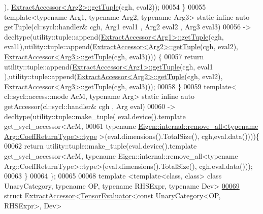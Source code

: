 \begin{DoxyCode}
      ), \hyperlink{struct_eigen_1_1_tensor_sycl_1_1internal_1_1_extract_accessor}{ExtractAccessor<Arg2>::getTuple}(cgh, eval2));
00054   \}
00055   \textcolor{keyword}{template}<\textcolor{keyword}{typename} Arg1, \textcolor{keyword}{typename} Arg2, \textcolor{keyword}{typename} Arg3> \textcolor{keyword}{static} \textcolor{keyword}{inline} \textcolor{keyword}{auto} getTuple(cl::sycl::handler& cgh,
       Arg1 eval1 , Arg2 eval2 , Arg3 eval3)
00056   -> decltype(utility::tuple::append(\hyperlink{struct_eigen_1_1_tensor_sycl_1_1internal_1_1_extract_accessor}{ExtractAccessor<Arg1>::getTuple}(cgh, 
      eval1),utility::tuple::append(\hyperlink{struct_eigen_1_1_tensor_sycl_1_1internal_1_1_extract_accessor}{ExtractAccessor<Arg2>::getTuple}(cgh, eval2), 
      \hyperlink{struct_eigen_1_1_tensor_sycl_1_1internal_1_1_extract_accessor}{ExtractAccessor<Arg3>::getTuple}(cgh, eval3)))) \{
00057     \textcolor{keywordflow}{return} utility::tuple::append(\hyperlink{struct_eigen_1_1_tensor_sycl_1_1internal_1_1_extract_accessor}{ExtractAccessor<Arg1>::getTuple}(cgh, eval1
      ),utility::tuple::append(\hyperlink{struct_eigen_1_1_tensor_sycl_1_1internal_1_1_extract_accessor}{ExtractAccessor<Arg2>::getTuple}(cgh, eval2), 
      \hyperlink{struct_eigen_1_1_tensor_sycl_1_1internal_1_1_extract_accessor}{ExtractAccessor<Arg3>::getTuple}(cgh, eval3)));
00058   \}
00059   \textcolor{keyword}{template}< cl::sycl::access::mode AcM, \textcolor{keyword}{typename} Arg> \textcolor{keyword}{static} \textcolor{keyword}{inline} \textcolor{keyword}{auto} getAccessor(cl::sycl::handler& cgh
      , Arg eval)
00060   -> decltype(utility::tuple::make\_tuple( eval.device().template get\_sycl\_accessor<AcM,
00061   \textcolor{keyword}{typename} \hyperlink{group___sparse_core___module}{Eigen::internal::remove\_all<typename Arg::CoeffReturnType>::type}
      >(eval.dimensions().TotalSize(), cgh,eval.data())))\{
00062     \textcolor{keywordflow}{return} utility::tuple::make\_tuple(eval.device().template get\_sycl\_accessor<AcM, typename
       Eigen::internal::remove\_all<typename Arg::CoeffReturnType>::type>(eval.dimensions().TotalSize(), cgh,eval.data()));
00063   \}
00064 \};
00065 
00068 \textcolor{keyword}{template} <\textcolor{keyword}{template}<\textcolor{keyword}{class}, \textcolor{keyword}{class}> \textcolor{keyword}{class }UnaryCategory, \textcolor{keyword}{typename} OP, \textcolor{keyword}{typename} RHSExpr, \textcolor{keyword}{typename} Dev>
\hyperlink{struct_eigen_1_1_tensor_sycl_1_1internal_1_1_extract_accessor_3_01_tensor_evaluator_3_01const_01cbe2714586475efcce37ac5bc511db9a}{00069} \textcolor{keyword}{struct }\hyperlink{struct_eigen_1_1_tensor_sycl_1_1internal_1_1_extract_accessor}{ExtractAccessor}<\hyperlink{struct_eigen_1_1_tensor_evaluator}{TensorEvaluator}<const UnaryCategory<OP, RHSExpr>, Dev>

\end{DoxyCode}
